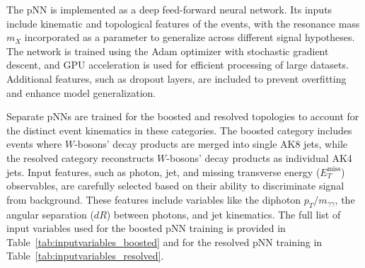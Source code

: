 The pNN is implemented as a deep feed-forward neural network. Its inputs include kinematic and topological features of the events, with the resonance mass \(m_X\) incorporated as a parameter to generalize across different signal hypotheses. The network is trained using the Adam optimizer with stochastic gradient descent, and GPU acceleration is used for efficient processing of large datasets. Additional features, such as dropout layers, are included to prevent overfitting and enhance model generalization.

Separate pNNs are trained for the boosted and resolved topologies to account for the distinct event kinematics in these categories.
The boosted category includes events where \(W\)-bosons' decay products are merged into single AK8 jets, while the resolved category reconstructs \(W\)-bosons' decay products as individual AK4 jets.
Input features, such as photon, jet, and missing transverse energy (\(E_T^{\text{miss}}\)) observables, are carefully selected based on their ability to discriminate signal from background. These features include variables like the diphoton \(p_T/m_{\gamma\gamma}\), the angular separation (\(dR\)) between photons, and jet kinematics. The full list of input variables used for the boosted pNN training is provided in Table~\ref{tab:inputvariables_boosted} and for the resolved pNN training in Table~\ref{tab:inputvariables_resolved}.
